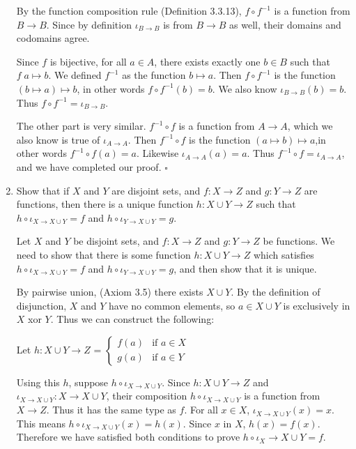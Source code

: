 \documentclass[../../main.tex]{subfiles}
\begin{document}
\begin{enumerate}
\begin{prf}
        By the function composition rule (Definition 3.3.13), $f \circ f^{-1}$ is a function from $B \to B$. Since by definition $\iota_{B \to B}$ is from $B \to B$ as well, their domains and codomains agree.

        Since $f$ is bijective, for all $a \in A$, there exists exactly one $b \in B$ such that $f \; a \mapsto b$. We defined $f^{-1}$ as the function $b \mapsto a$. Then $f \circ f^{-1}$ is the function $(b \mapsto a) \mapsto b$, in other words $f \circ f^{-1}(b)=b$. We also know $\iota_{B \to B}(b)=b$. Thus $f \circ f^{-1} = \iota_{B \to B}$.

        The other part is very similar. $f^{-1} \circ f$ is a function from $A \to A$, which we also know is true of $\iota_{A \to A}$. Then $f^{-1} \circ f$ is the function $(a \mapsto b) \mapsto a$,in other words $f^{-1} \circ f(a)=a$. Likewise $\iota_{A \to A}(a)=a$. Thus $f^{-1} \circ f = \iota_{A \to A}$, and we have completed our proof.
        $\square$
    \end{prf}

    \item 
    \begin{q}
        Show that if $X$ and $Y$ are disjoint sets, and $f: X \to Z$ and $g: Y \to Z$ are functions, then there is a unique function $h: X \cup Y \to Z$ such that $h \circ \iota_{X \to X \cup Y} = f$ and $h \circ \iota_{Y \to X \cup Y} = g.$
    \end{q}

    
    \begin{prf}
        Let $X$ and $Y$ be disjoint sets, and $f: X \to Z$ and $g: Y \to Z$ be functions.
        We need to show that there is some function $h: X \cup Y \to Z$ which satisfies $h \circ \iota_{X \to X \cup Y} = f$ and $h \circ \iota_{Y \to X \cup Y} = g$, and then show that it is unique.
    
        By pairwise union, (Axiom 3.5) there exists $X \cup Y$. By the definition of disjunction, $X$ and $Y$ have no common elements, so $a \in X \cup Y$ is exclusively in $X$ xor $Y$. Thus we can construct the following:
    
        Let $h: X \cup Y \to Z$ = \(
            \begin{cases}
                f(a) & \text{if } a \in X \\
                g(a) & \text{if } a \in Y
            \end{cases}
        \)

        Using this $h$, suppose $h \circ \iota_{X \to X \cup Y}$.
        Since $h: X \cup Y \to Z$ and $\iota_{X \to X \cup Y}: X \to X \cup Y$, their composition $h \circ \iota_{X \to X \cup Y}$ is a function from $X \to Z$. 
        Thus it has the same type as $f$.
        For all $x \in X$, $\iota_{X \to X \cup Y}(x)=x$.
        This means $h \circ \iota_{X \to X \cup Y}(x) = h(x)$. Since $x$ in $X$, $h(x) = f(x)$.
        Therefore we have satisfied both conditions to prove $h \circ \iota_X \to X \cup Y = f$.


\end{prf}
\end{enumerate}
\end{document}
